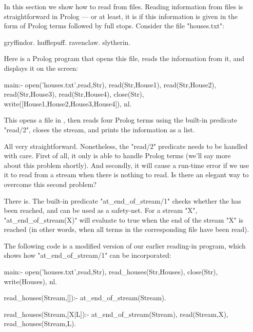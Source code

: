 In this section we show how to read from files.  Reading information
from files is straightforward in Prolog --- or at least, it is if this
information is given in the form of Prolog terms followed
by full stops. Consider the file "houses.txt":

\begin{LPNcodedisplay}
gryffindor.
hufflepuff.
ravenclaw.
slytherin.
\end{LPNcodedisplay}
Here is a Prolog program that opens this file, reads
the information from it, and displays it on the screen:

\begin{LPNcodedisplay}
main:-
   open('houses.txt',read,Str),
   read(Str,House1),
   read(Str,House2),
   read(Str,House3),
   read(Str,House4),
   close(Str),
   write([House1,House2,House3,House4]), nl.
\end{LPNcodedisplay}
This opens a file in , then reads
four Prolog terms using the built-in predicate "read/2",
closes the stream, and prints the information as a list.

All very straightforward. Nonetheless, the "read/2" predicate needs to
be handled with care. First of all, it only is able to handle Prolog
terms (we'll say more about this problem shortly). And secondly, it
will cause a run-time error if we use it to read from a stream when
there is nothing to read. Is there an elegant way to overcome this
second problem?

There is. The built-in predicate "at_end_of_stream/1" checks whether
the  has been reached, and can be
used as a safety-net.  For a stream "X", "at_end_of_stream(X)"
will
evaluate to true  when the end of the stream "X" is reached (in other
words, when all terms in the corresponding file have been read).

The following code is a modified version of our earlier reading-in
program, which shows how "at_end_of_stream/1" can be incorporated:

\begin{LPNcodedisplay}
main:-
   open('houses.txt',read,Str),
   read_houses(Str,Houses),
   close(Str),
   write(Houses), nl.

read_houses(Stream,[]):-
   at_end_of_stream(Stream).

read_houses(Stream,[X|L]):-
   \+ at_end_of_stream(Stream),
   read(Stream,X),
   read_houses(Stream,L).
\end{LPNcodedisplay}

